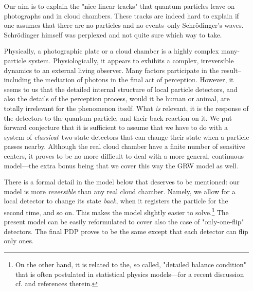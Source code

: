 \documentclass[12pt]{article}
\begin{document}
Our aim is to explain the "nice linear tracks" that quantum particles leave
on photographs and in cloud chambers. These tracks are indeed hard to
explain if one assumes that there are no particles and no events--only
Schr\"odinger's waves. Schr\"odinger himself was perplexed and not quite
sure which way to take.

Physically, a photographic plate or a cloud chamber is a highly complex
many-particle system. Physiologically, it appears to exhibits a complex,
irreversible dynamics to an external living observer. Many factors
participate in the result--including the mediation of photons in the
final act of perception. However, it seems to us that the detailed internal
structure of local particle detectors, and also the details of the
perception process, would it be human or animal, are totally irrelevant for
the phenomenon itself. What {\sl is} relevant, it is the response of the
detectors to the quantum particle, and their back reaction on it. We put
forward conjecture that it is sufficient to assume that we have to do with
a system of {\sl classical}\, two-state detectors that can change their
state when a particle passes nearby. Although the real cloud chamber have a
finite number of sensitive centers, it proves to be no more difficult to
deal with a more general, continuous model---the extra bonus being that we
cover this way the GRW model as well.

There is a formal detail in the model below that deserves to be mentioned:
our model is more {\sl reversible} than any real cloud chamber. Namely, we
allow for a local detector to change its state {\sl back}, when it
registers the particle for the second time, and so on. This makes the model
slightly easier to solve.\footnote{On the other hand, it is related to
the, so called, "detailed balance condition" that is often postulated in
statistical physics models---for a recent discussion cf. \cite{stree1} and
references therein.} The present model can be easily reformulated to cover
also the case of "only-one-flip" detectors. The final PDP proves to be the
same except that each detector can flip only ones.
\end{document}
